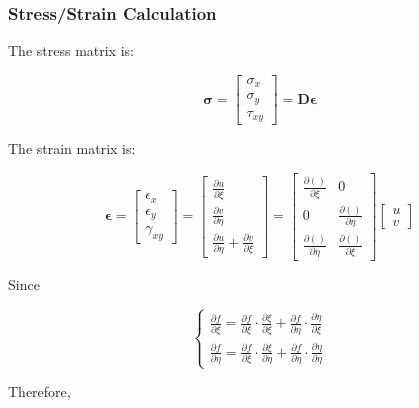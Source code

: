 \documentclass{article}
\begin{document}
\subsubsection{Stress/Strain Calculation}

The stress matrix is:

\[
  \mathbf{\sigma} = \begin{bmatrix}
    \sigma_x \\
    \sigma_y \\
    \tau_{xy}
  \end{bmatrix} = \mathbf{D} \mathbf{\epsilon}
\]

The strain matrix is:

\[
  \mathbf{\epsilon} = \begin{bmatrix}
    \epsilon_x \\
    \epsilon_y \\
    \gamma_{xy}
  \end{bmatrix}
  = \begin{bmatrix}
    \frac{\partial u}{\partial \xi}  \\
    \frac{\partial v}{\partial \eta} \\
    \frac{\partial u}{\partial \eta} + \frac{\partial v}{\partial \xi}
  \end{bmatrix}
  = \begin{bmatrix}
    \frac{\partial()}{\partial \xi}  & 0                                \\
    0                                & \frac{\partial()}{\partial \eta} \\
    \frac{\partial()}{\partial \eta} & \frac{\partial()}{\partial \xi}
  \end{bmatrix}
  \begin{bmatrix}
    u \\
    v
  \end{bmatrix}
\]

Since

\[
  \begin{cases}
    \frac{\partial f}{\partial \xi} = \frac{\partial f}{\partial \xi} \cdot \frac{\partial \xi}{\partial \xi} + \frac{\partial f}{\partial \eta} \cdot \frac{\partial \eta}{\partial \xi} \\
    \frac{\partial f}{\partial \eta} = \frac{\partial f}{\partial \xi} \cdot \frac{\partial \xi}{\partial \eta} + \frac{\partial f}{\partial \eta} \cdot \frac{\partial \eta}{\partial \eta}
  \end{cases}
\]

Therefore,
\end{document}
